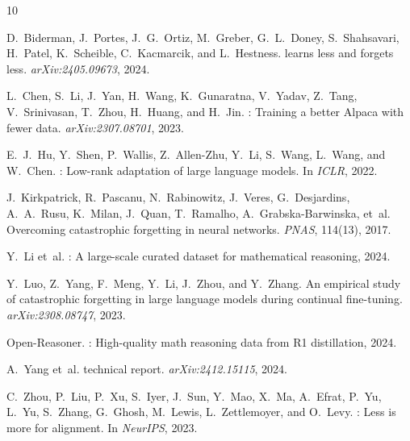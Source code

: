 \documentclass{article}
\begin{document}
\begin{thebibliography}{10}

D.~Biderman, J.~Portes, J.~G.~Ortiz, M.~Greber, G.~L.~Doney, S.~Shahsavari, H.~Patel, K.~Scheible, C.~Kacmarcik, and L.~Hestness.
 learns less and forgets less.
\newblock \emph{arXiv:2405.09673}, 2024.

L.~Chen, S.~Li, J.~Yan, H.~Wang, K.~Gunaratna, V.~Yadav, Z.~Tang, V.~Srinivasan, T.~Zhou, H.~Huang, and H.~Jin.
: Training a better {Alpaca} with fewer data.
\newblock \emph{arXiv:2307.08701}, 2023.

E.~J.~Hu, Y.~Shen, P.~Wallis, Z.~Allen-Zhu, Y.~Li, S.~Wang, L.~Wang, and W.~Chen.
: Low-rank adaptation of large language models.
\newblock In \emph{ICLR}, 2022.

J.~Kirkpatrick, R.~Pascanu, N.~Rabinowitz, J.~Veres, G.~Desjardins, A.~A.~Rusu, K.~Milan, J.~Quan, T.~Ramalho, A.~Grabska-Barwinska, et~al.
\newblock Overcoming catastrophic forgetting in neural networks.
\newblock \emph{PNAS}, 114(13), 2017.

Y.~Li et~al.
: A large-scale curated dataset for mathematical reasoning, 2024.

Y.~Luo, Z.~Yang, F.~Meng, Y.~Li, J.~Zhou, and Y.~Zhang.
\newblock An empirical study of catastrophic forgetting in large language models during continual fine-tuning.
\newblock \emph{arXiv:2308.08747}, 2023.

{Open-Reasoner}.
: High-quality math reasoning data from {R1} distillation, 2024.

A.~Yang et~al.
 technical report.
\newblock \emph{arXiv:2412.15115}, 2024.

C.~Zhou, P.~Liu, P.~Xu, S.~Iyer, J.~Sun, Y.~Mao, X.~Ma, A.~Efrat, P.~Yu, L.~Yu, S.~Zhang, G.~Ghosh, M.~Lewis, L.~Zettlemoyer, and O.~Levy.
: Less is more for alignment.
\newblock In \emph{NeurIPS}, 2023.

\end{thebibliography}

\newpage
\appendix
\end{document}
